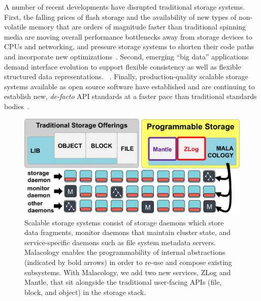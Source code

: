 \documentclass[preprint]{sigplanconf-eurosys}
\begin{document}
A number of recent developments have disrupted traditional storage systems.
First, the falling prices of flash storage and the availability of new types of
non-volatile memory that are orders of magnitude faster than traditional
spinning media are moving overall performance bottlenecks away from storage
devices to CPUs and networking, and pressure storage systems to shorten their
code paths and incorporate new
optimizations~\cite{gray_tape_2007,gray_flash_2008}. 
Second, emerging ``big data'' applications demand interface evolution to
support flexible consistency as well as flexible structured data
representations.  ~\cite{apache_contributors_parquet_2014}. 
Finally, production-quality
scalable storage systems available as open source software have established and
are continuing to establish new, \emph{de-facto} API standards at a faster pace
than traditional standards
bodies~\cite{snia_implementing_2014,linux_foundation_kinetic_2015}.

\begin{figure}[tb]
\centering
\includegraphics{figures/overview.png}
\caption{Scalable storage systems consist of storage daemons which store data
fragments, monitor daemons that maintain cluster state, and service-specific
daemons such as file system metadata servers. Malacology enables the
programmability of internal abstractions (indicated by bold arrows) in order to
re-use and compose existing subsystems.  With Malacology, we add two new
services, ZLog and Mantle, that sit alongside the traditional user-facing APIs
(file, block, and object) in the storage stack.  \label{fig:overview}}
\end{figure}
\end{document}

